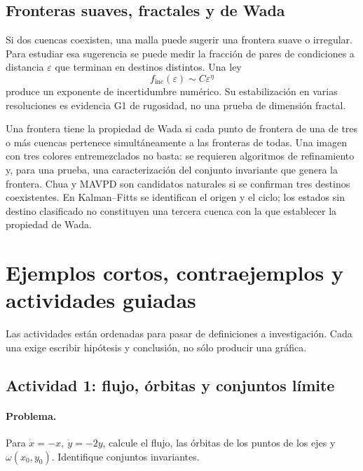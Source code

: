 \subsection{Fronteras suaves, fractales y de Wada}

\HAFOCardFractal

Si dos cuencas coexisten, una malla puede sugerir una frontera suave o
irregular. Para estudiar esa sugerencia se puede medir la fracción de pares
de condiciones a distancia \(\varepsilon\) que terminan en destinos distintos.
Una ley
\begin{equation}
 f_{\mathrm{inc}}(\varepsilon)\sim C\varepsilon^\eta
 \label{geo:eq:uncertainty-exponent}
\end{equation}
produce un exponente de incertidumbre numérico. Su estabilización en varias
resoluciones es evidencia G1 de rugosidad, no una prueba de dimensión fractal.

Una frontera tiene la propiedad de Wada si cada punto de frontera de una de
tres o más cuencas pertenece simultáneamente a las fronteras de todas. Una
imagen con tres colores entremezclados no basta: se requieren algoritmos de
refinamiento y, para una prueba, una caracterización del conjunto invariante
que genera la frontera. Chua y MAVPD son candidatos naturales si se confirman
tres destinos coexistentes. En Kalman--Fitts se identifican el origen y el
ciclo; los estados sin destino clasificado no constituyen una tercera cuenca
con la que establecer la propiedad de Wada.

\fi

\ifHAFOdigitalcontent
\section{Ejemplos cortos, contraejemplos y actividades guiadas}
\label{sec:geo-activities}

Las actividades están ordenadas para pasar de definiciones a investigación.
Cada una exige escribir hipótesis y conclusión, no sólo producir una gráfica.

\subsection{Actividad 1: flujo, órbitas y conjuntos límite}

\paragraph{Problema.}
Para
\(\dot x=-x,\ \dot y=-2y\), calcule el flujo, las órbitas de los puntos de los
ejes y \(\omega(x_0,y_0)\). Identifique conjuntos invariantes.

